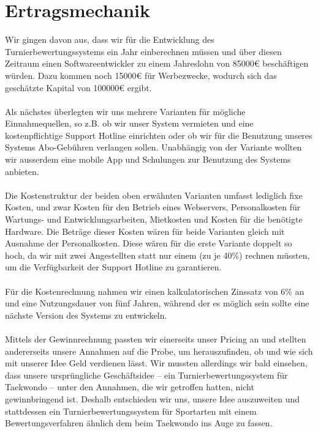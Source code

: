 \section{Ertragsmechanik}
Wir gingen davon aus, dass wir für die Entwicklung des Turnierbewertungssystems ein Jahr einberechnen müssen und über diesen Zeitraum
    einen Softwareentwickler zu einem Jahreslohn von 85000€ beschäftigen würden.
Dazu kommen noch 15000€ für Werbezwecke, wodurch sich das geschätzte Kapital von 100000€ ergibt.
\\\\
Als nächstes überlegten wir uns mehrere Varianten für mögliche Einnahmequellen, so z.B. ob wir unser System vermieten und eine kostenpflichtige Support Hotline einrichten oder ob wir für die Benutzung unseres Systems Abo-Gebühren verlangen sollen.
Unabhängig von der Variante wollten wir ausserdem eine mobile App und Schulungen zur Benutzung des Systems anbieten.
\\\\
Die Kostenstruktur der beiden oben erwähnten Varianten umfasst lediglich fixe Kosten, und zwar Kosten für den Betrieb eines Webservers,
    Personalkosten für Wartungs- und Entwicklungsarbeiten, Mietkosten und Kosten für die benötigte Hardware.
Die Beträge dieser Kosten wären für beide Varianten gleich mit Ausnahme der Personalkosten.
Diese wären für die erste Variante doppelt so hoch, da wir mit zwei Angestellten statt nur einem (zu je 40\%) rechnen müssten,
    um die Verfügbarkeit der Support Hotline zu garantieren.
\\\\
Für die Kostenrechnung nahmen wir einen kalkulatorischen Zinssatz von 6\% an und eine Nutzungsdauer von fünf Jahren,
    während der es möglich sein sollte eine nächste Version des Systems zu entwickeln.
\\\\
Mittels der Gewinnrechnung passten wir einerseits unser Pricing an und stellten andererseits unsere Annahmen auf die Probe,
    um herauszufinden, ob und wie sich mit unserer Idee Geld verdienen lässt.
Wir mussten allerdings wir bald einsehen, dass unsere ursprüngliche Geschäftsidee – ein Turnierbewertungssystem für
    Taekwondo – unter den Annahmen, die wir getroffen hatten, nicht gewinnbringend ist.
Deshalb entschieden wir uns, unsere Idee auszuweiten und stattdessen ein Turnierbewertungssystem für Sportarten mit einem
    Bewertungsverfahren ähnlich dem beim Taekwondo ins Auge zu fassen.
\\\\
